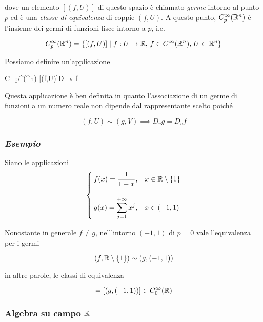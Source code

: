 dove un elemento $ [(f,U)] $ di questo spazio è chiamato \textit{germe} intorno al punto $ p $ ed è una \textit{classe di equivalenza} di coppie $ (f,U) $. A questo punto, $ C_{p}^{\infty}(\mathbb{R}^{n}) $ è l'insieme dei germi di funzioni lisce intorno a $ p $, i.e.

\begin{equation}
	C_{p}^{\infty}(\mathbb{R}^{n}) = \{ [(f,U)] \mid f : U \to \mathbb{R}, \, f \in C^{\infty}(\mathbb{R}^{n}), \, U \subset \mathbb{R}^{n} \}
\end{equation} 

Possiamo definire un'applicazione

	{C_{p}^{\infty}(\R^{n})}{\R}
	{[(f,U)]}{D_{v} f}

Questa applicazione è ben definita in quanto l'associazione di un germe di funzioni a un numero reale non dipende dal rappresentante scelto poiché

\begin{equation}
	(f,U) \sim (g,V) \implies D_{v} g = D_{v} f
\end{equation}

\subsubsection{\textit{Esempio}}

Siano le applicazioni
\begin{equation}
	\begin{cases}
		f(x) = \dfrac{1}{1-x}, & x \in \mathbb{R} \setminus \{1\} \\ \\
		g(x) = \displaystyle\sum_{j=1}^{+\infty} x^{j}, & x \in (-1,1)
	\end{cases}
\end{equation}

Nonostante in generale $ f \neq g $, nell'intorno $ (-1,1) $ di $ p=0 $ vale l'equivalenza per i germi

\begin{equation}
	(f,\mathbb{R} \setminus \{1\}) \sim (g,(-1,1))
\end{equation}

in altre parole, le classi di equivalenza

\begin{equation}
	[(f,\R \setminus \{1\})] = [(g,(-1,1))] \in C_{0}^{\infty}(\R)
\end{equation}

\subsubsection{Algebra su campo $ \mathbb{K} $}

